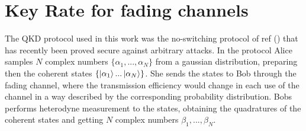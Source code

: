 \documentclass[%
 reprint,
 amsmath,amssymb,
 aps,
]{revtex4-1}
\begin{document}
\section{Key Rate for fading channels}
The QKD protocol used in this work was the no-switching protocol of ref () that has recently been proved secure against arbitrary attacks. In the protocol Alice samples $N$ complex numbers $\{\alpha_1,...,\alpha_N\}$ from a gaussian distribution, preparing then the coherent states $\{\ket{\alpha_1}...\ket{\alpha_N}\}$. She sends the states to Bob through the fading channel, where the transmission efficiency would change in each use of the channel in a way described by the corresponding probability distribution. Bobs performs heterodyne measurement to the states, obtaining the quadratures of the coherent states and getting $N$ complex numbers $\beta_1,...,\beta_N$.
\end{document}
